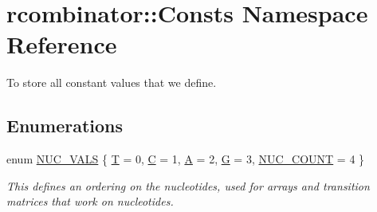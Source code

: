 \hypertarget{namespacercombinator_1_1Consts}{}\section{rcombinator\+:\+:Consts Namespace Reference}
\label{namespacercombinator_1_1Consts}


To store all constant values that we define.  


\subsection*{Enumerations}
\begin{DoxyCompactItemize}
\item 
enum \mbox{\hyperlink{namespacercombinator_1_1Consts_aaa096a23d1bc2fdb1992265192fae907}{N\+U\+C\+\_\+\+V\+A\+LS}} \{ \newline
\mbox{\hyperlink{namespacercombinator_1_1Consts_aaa096a23d1bc2fdb1992265192fae907a28700244abb5c707ccefb9bde756e436}{T}} = 0, 
\mbox{\hyperlink{namespacercombinator_1_1Consts_aaa096a23d1bc2fdb1992265192fae907af522785f2f571764ccee708d2fe93095}{C}} = 1, 
\mbox{\hyperlink{namespacercombinator_1_1Consts_aaa096a23d1bc2fdb1992265192fae907aca9ee451a44f492976f6b64caef761a1}{A}} = 2, 
\mbox{\hyperlink{namespacercombinator_1_1Consts_aaa096a23d1bc2fdb1992265192fae907a5020e318d196247b860e9fe541f74d33}{G}} = 3, 
\newline
\mbox{\hyperlink{namespacercombinator_1_1Consts_aaa096a23d1bc2fdb1992265192fae907aa51005e405016569840eefdd20caf39b}{N\+U\+C\+\_\+\+C\+O\+U\+NT}} = 4
 \}
\begin{DoxyCompactList}\small\item\em This defines an ordering on the nucleotides, used for arrays and transition matrices that work on nucleotides. \end{DoxyCompactList}\end{DoxyCompactItemize}
